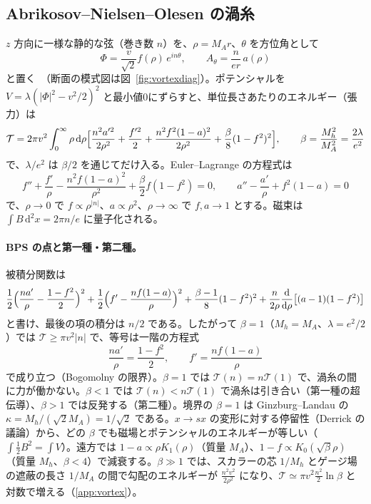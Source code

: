 \documentclass[a4paper,10pt]{ltjsarticle}
\newcommand{\dd}{\mathrm{d}}
\begin{document}
\subsection{Abrikosov--Nielsen--Olesen の渦糸}\label{sec:vortex}

$z$ 方向に一様な静的な弦（巻き数 $n$）を、$\rho=M_Ar$、$\theta$ を方位角として
\begin{equation*}
\Phi=\frac v{\sqrt2}f(\rho)\,e^{in\theta},\qquad A_\theta=\frac n{er}\,a(\rho)
\end{equation*}
と置く~\cite{abrikosov57,no73}（断面の模式図は図~\ref{fig:vortexdiag}）。ポテンシャルを $V=\lambda(|\Phi|^2-v^2/2)^2$ と最小値0にずらすと、単位長さあたりのエネルギー（張力）は
\begin{equation}
\mathcal T=2\pi v^2\int_0^\infty\rho\,\dd\rho\Bigl[\frac{n^2a'^2}{2\rho^2}+\frac{f'^2}2+\frac{n^2f^2(1-a)^2}{2\rho^2}+\frac\beta8(1-f^2)^2\Bigr],\qquad \beta=\frac{M_h^2}{M_A^2}=\frac{2\lambda}{e^2}
\label{eq:tension}
\end{equation}
で、$\lambda/e^2$ は $\beta/2$ を通じてだけ入る。Euler--Lagrange の方程式は
\begin{equation}
f''+\frac{f'}\rho-\frac{n^2f(1-a)^2}{\rho^2}+\frac\beta2f(1-f^2)=0,\qquad a''-\frac{a'}\rho+f^2(1-a)=0
\label{eq:vortexeq}
\end{equation}
で、$\rho\to0$ で $f\propto\rho^{|n|}$、$a\propto\rho^2$、$\rho\to\infty$ で $f,a\to1$ とする。磁束は $\int B\,\dd^2x=2\pi n/e$ に量子化される。

\paragraph{BPS の点と第一種・第二種。}被積分関数は
\begin{equation*}
\frac12\Bigl(\frac{na'}\rho-\frac{1-f^2}2\Bigr)^2+\frac12\Bigl(f'-\frac{nf(1-a)}\rho\Bigr)^2+\frac{\beta-1}8(1-f^2)^2+\frac n{2\rho}\frac{\dd}{\dd\rho}\bigl[(a-1)(1-f^2)\bigr]
\end{equation*}
と書け、最後の項の積分は $n/2$ である。したがって $\beta=1$（$M_h=M_A$、$\lambda=e^2/2$）では $\mathcal T\ge\pi v^2|n|$ で、等号は一階の方程式
\begin{equation}
\frac{na'}\rho=\frac{1-f^2}2,\qquad f'=\frac{nf(1-a)}\rho
\label{eq:bps}
\end{equation}
で成り立つ（Bogomolny の限界）。$\beta=1$ では $\mathcal T(n)=n\mathcal T(1)$ で、渦糸の間に力が働かない。$\beta<1$ では $\mathcal T(n)<n\mathcal T(1)$ で渦糸は引き合い（第一種の超伝導）、$\beta>1$ では反発する（第二種）。境界の $\beta=1$ は Ginzburg--Landau の $\kappa=M_h/(\sqrt2M_A)=1/\sqrt2$ である。$x\to sx$ の変形に対する停留性（Derrick の議論）から、どの $\beta$ でも磁場とポテンシャルのエネルギーが等しい（$\int\frac12B^2=\int V$）。遠方では $1-a\propto\rho K_1(\rho)$（質量 $M_A$）、$1-f\propto K_0(\sqrt\beta\rho)$（質量 $M_h$、$\beta<4$）で減衰する。$\beta\gg1$ では、スカラーの芯 $1/M_h$ とゲージ場の遮蔽の長さ $1/M_A$ の間で勾配のエネルギーが $\frac{n^2v^2}{2\rho^2}$ になり、$\mathcal T\simeq\pi v^2\frac{n^2}2\ln\beta$ と対数で増える（\ref{app:vortex}）。
\end{document}
